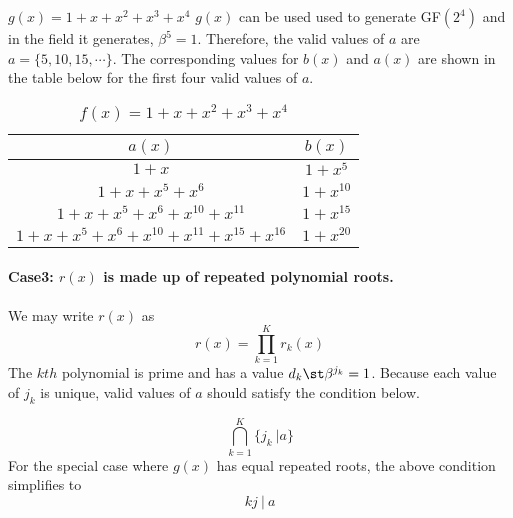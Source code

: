 \begin{example}
$g(x)=1+x+x^2+x^3+x^4$\newline
$g(x)$ can be used used to generate GF$(2^4)$ and in the field it generates, $\beta^{5}=1$. Therefore, the valid values of $a$ are $a=\{5,10,15,\cdots\}$. The corresponding values for $b(x)$ and $a(x)$ are shown in the table below for the first four valid values of $a$.

\begin{table*}[h]
 \caption{$f(x)=1+x+x^2+x^3+x^4$}
\centering
 \begin{tabular}{c c} 
 \hline
 $a(x)$ & $b(x)$  \\ [0.5ex] 
 \hline\hline
$1+x$ &$1+x^5$\\ 
$1+x+x^5+x^6$ &$1+x^{10}$  \\
$1+x+x^5+x^6+x^{10}+x^{11}$ & $1+x^{15}$ \\
$1+x+x^5+x^6+x^{10}+x^{11}+x^{15}+x^{16}$ &$1+x^{20}$  
 \end{tabular}
 \label{novelTab3}
\end{table*}
\end{example}


\paragraph{Case3: $r(x)$ is made up of repeated polynomial roots. \newline}
We may write $r(x)$ as $$r(x)=\prod_{k=1}^{K}r_k(x)$$ The $kth$ polynomial is prime and has a value $d_k \st \beta^{j_k}=1$. Because each value of $j_k$ is unique, valid values of $a$ should satisfy the condition below. 

$$ \bigcap_{k=1}^{K} \{j_k~| a\}$$
For the special case where $g(x)$ has equal repeated roots, the above condition simplifies to 
$$kj ~| ~a$$

